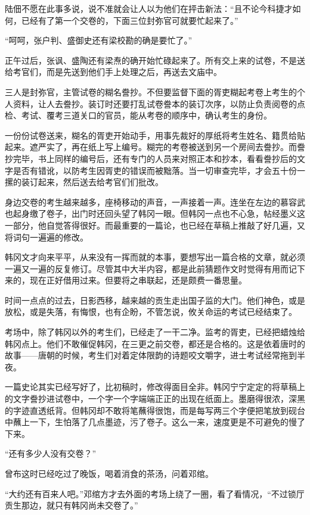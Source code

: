 陆佃不愿在此事多说，说不准就会让人以为他们在抨击新法：“且不论今科捷才如何，已经有了第一个交卷的，下面三位封弥官可就要忙起来了。”

“呵呵，张户判、盛御史还有梁校勘的确是要忙了。”

正午过后，张讽、盛陶还有梁焘的确开始忙碌起来了。所有交上来的试卷，不是送给考官们，而是先送到他们手上处理之后，再送去文庙中。

三人是封弥官，主管试卷的糊名誊抄。不但要监督下面的胥吏糊起考卷上考生的个人资料，让人去誊抄。装订时还要打乱试卷誊本的装订次序，以防止负责阅卷的点检、考试、覆考三道关口的官员，能从考卷的顺序中，确认考生的身份。

一份份试卷送来，糊名的胥吏开始动手，用事先裁好的厚纸将考生姓名、籍贯给贴起来。遮严实了，再在纸上写上编号。糊完的考卷被送到另一个房间去誊抄。而誊抄完毕，书上同样的编号后，还有专门的人员来对照正本和抄本，看看誊抄后的文字是否有错讹，以防考生因胥吏的错误而被黜落。当一切审查完毕，才会五十份一摞的装订起来，然后送去给考官们们批改。

身边交卷的考生越来越多，座椅移动的声音，一声接着一声。连坐在左边的慕容武也起身缴了卷子，出门时还回头望了韩冈一眼。但韩冈一点也不心急，帖经墨义这一部分，他自觉答得很好。而最重要的一篇论，也已经在草稿上推敲了好几遍，又将词句一遍遍的修改。

韩冈文才向来平平，从来没有一挥而就的本事，要想写出一篇合格的文章，就必须一遍又一遍的反复修订。尽管其中大半内容，都是此前猜题作文时觉得有用而记下来的，现在正好借用过来。但要将之串联起，还是颇费一番思量。

时间一点点的过去，日影西移，越来越的贡生走出国子监的大门。他们神色，或是放松，或是失落，有悔恨，也有企盼，不管怎说，攸关命运的考试已经结束了。

考场中，除了韩冈以外的考生们，已经走了一干二净。监考的胥吏，已经把蜡烛给韩冈点上。他们不敢催促韩冈，在三更之前交卷，都还是合格的。这是依着唐时的故事——唐朝的时候，考生们对着定体限韵的诗题咬文嚼字，进士考试经常拖到半夜。

一篇史论其实已经写好了，比初稿时，修改得面目全非。韩冈宁宁定定的将草稿上的文字誊抄进试卷中，一个字一个字端端正正的出现在纸面上。墨磨得很浓，深黑的字迹直透纸背。但韩冈却不敢将笔蘸得很饱，而是每写两三个字便把笔放到砚台中蘸上一下，生怕落了几点墨迹，污了卷子。这么一来，速度更是不可避免的慢了下来。

“还有多少人没有交卷？”

曾布这时已经吃过了晚饭，喝着消食的茶汤，问着邓绾。

“大约还有百来人吧。”邓绾方才去外面的考场上绕了一圈，看了看情况，“不过锁厅贡生那边，就只有韩冈尚未交卷了。”

